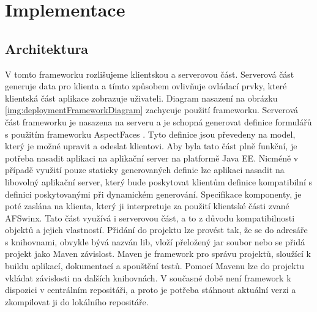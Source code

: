 \chapter{Implementace} 
\section{Architektura}
V tomto frameworku rozlišujeme klientskou a serverovou část. Serverová část generuje data pro klienta a tímto způsobem ovlivňuje ovládací prvky, které klientská část aplikace zobrazuje uživateli. Diagram nasazení na obrázku \ref{img:deploymentFrameworkDiagram} zachycuje použití frameworku. Serverová část frameworku je nasazena na serveru a je schopná generovat definice formulářů s použitím frameworku AspectFaces \cite{aspectfaces}. Tyto definice jsou převedeny na model, který je možné upravit a odeslat klientovi. Aby byla tato část plně funkční, je potřeba nasadit aplikaci na aplikační server na platformě Java EE. Nicméně v případě využití pouze staticky generovaných definic lze aplikaci nasadit na libovolný aplikační server, který bude poskytovat klientům definice kompatibilní s definici poskytovanými při dynamickém generování. Specifikace komponenty, je poté zaslána na klienta, který ji interpretuje za použití klientské části zvané AFSwinx. Tato část využívá i serverovou část, a to z důvodu kompatibilnosti objektů a jejich vlastností. Přidání do projektu lze provést tak, že se do adresáře s knihovnami, obvykle bývá nazván lib, vloží přeložený jar soubor nebo se přidá projekt jako Maven závislost. Maven \cite{maven} je framework pro správu projektů, sloužící k buildu aplikací, dokumentací a spouštění testů. Pomocí Mavenu lze do projektu vkládat závislosti na dalších knihovnách. V současné době není framework k dispozici v centrálním repositáři, a proto je potřeba stáhnout aktuální verzi a zkompilovat ji do lokálního repositáře. 
